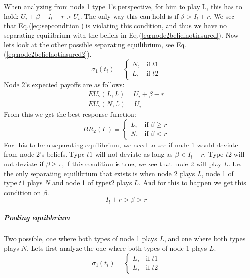 When analyzing from node 1 type 1's perspective, for him to play L, this has to hold: $U_{i}+\beta-I_{l}-r > U_{i}$. The only way this can hold is if $\beta>I_{l}+r$. We see that Eq.(\ref{eq:sepcondition}) is violating this condition, and thus we have no separating equilibrium with the beliefs in Eq.(\ref{eq:node2beliefnotinsured}).
Now lets look at the other possible separating equilibrium, see Eq.(\ref{eq:node2beliefnotinsured2}).
\begin{equation}
    \sigma_{1}(t_{i})= 
\begin{cases}
   N,& \text{if } t1\\
   L,& \text{if } t2  
\end{cases}
\label{eq:node2beliefnotinsured2}
\end{equation}
Node 2's expected payoffs are as follows:
\begin{eqnarray}
EU_{2}(L,L)=U_{i}+\beta-r \\
EU_{2}(N,L)=U_{i}
\end{eqnarray}
From this we get the best response function:
\begin{equation}
BR_{2}(L)=
\begin{cases}
L ,& \text{if } \beta\geq r \\
N ,& \text{if } \beta<r 
\end{cases}
\end{equation}
For this to be a separating equilibrium, we need to see if node 1 would deviate from node 2's beliefs. 
Type $t1$ will not deviate as long as $\beta<I_{l}+r$. Type $t2$ will not deviate if $\beta \geq r$, if this condition is true, we see that node 2 will play $L$. I.e. the only separating equilibrium that exists is when node 2 plays $L$, node 1 of type $t1$ plays $N$ and node 1 of type$t2$ plays $L$.
And for this to happen we get this condition on $\beta$. \begin{equation}
I_{l}+r>\beta>r
\label{eq:conditionseparatingequilibrium}
\end{equation}
\subparagraph{Pooling equilibrium}
Two possible, one where both types of node 1 plays $L$, and one where both types plays $N$. Lets first analyze the one where both types of node 1 plays $L$.
\begin{equation}
    \sigma_{1}(t_{i})= 
\begin{cases}
   L,& \text{if } t1\\
   L,& \text{if } t2  
\end{cases}
\label{eq:node2beliefnotinsuredpooling}
\end{equation}
